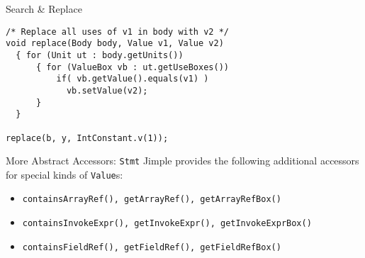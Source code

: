

\begin{slide}{Search \& Replace}
{\small
\begin{verbatim}
/* Replace all uses of v1 in body with v2 */
void replace(Body body, Value v1, Value v2) 
  { for (Unit ut : body.getUnits()) 
      { for (ValueBox vb : ut.getUseBoxes()) 
          if( vb.getValue().equals(v1) ) 
            vb.setValue(v2);
      }
  }

replace(b, y, IntConstant.v(1));
\end{verbatim}
}
\end{slide}

\begin{slide}{More Abstract Accessors: {\tt Stmt}}
Jimple provides the following additional accessors for special kinds of {\tt Value}s:

\begin{itemize}
\item {\tt containsArrayRef(),
 getArrayRef(),~getArrayRefBox()}
\item {\tt containsInvokeExpr(), getInvokeExpr(),~getInvokeExprBox()}
\item {\tt containsFieldRef(), getFieldRef(),~getFieldRefBox()}
\end{itemize}

\end{slide}
